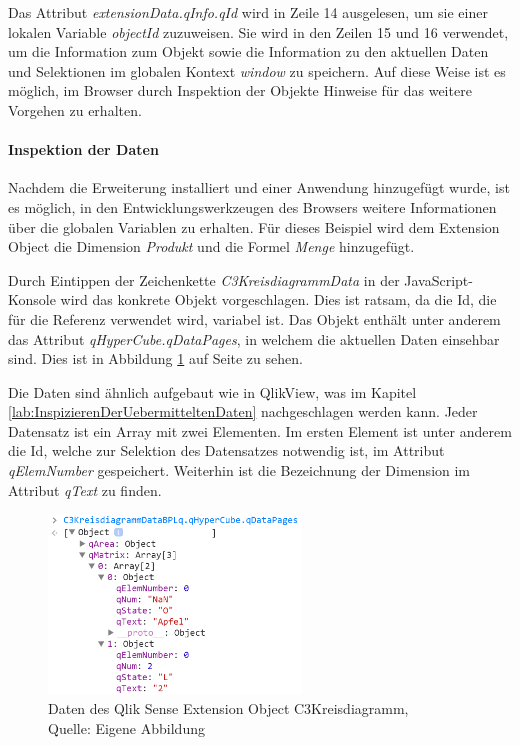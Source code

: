 Das Attribut \textit{extensionData.qInfo.qId} wird in Zeile 14 ausgelesen, um sie einer lokalen Variable \textit{objectId} zuzuweisen. Sie wird in den Zeilen 15 und 16 verwendet, um die Information zum Objekt sowie die Information zu den aktuellen Daten und Selektionen im globalen Kontext \textit{window} zu speichern. Auf diese Weise ist es möglich, im Browser durch Inspektion der Objekte Hinweise für das weitere Vorgehen zu erhalten.

\paragraph{Inspektion der Daten}


Nachdem die Erweiterung installiert und einer Anwendung hinzu\-gefügt wurde, ist es möglich, in den Entwicklungswerkzeugen des Browsers weitere Informationen über die globalen Variablen zu erhalten. Für dieses Beispiel wird dem Extension Object die Dimension \textit{Produkt} und die Formel \textit{Menge} hinzugefügt.

Durch Eintippen der Zeichenkette \textit{C3KreisdiagrammData} in der JavaScript-Konsole wird das konkrete Objekt vorgeschlagen. Dies ist ratsam, da die Id, die für die Referenz verwendet wird, variabel ist. Das Objekt enthält unter anderem das Attribut \textit{qHyperCube.qDataPages}, in welchem die aktuellen Daten einsehbar sind. Dies ist in Abbildung \ref{fig:qDataPages} auf Seite \pageref{fig:qDataPages} zu sehen.

Die Daten sind ähnlich aufgebaut wie in QlikView, was im Kapitel \ref{lab:InspizierenDerUebermitteltenDaten} nachgeschlagen werden kann. Jeder Daten\-satz ist ein Array mit zwei Elementen.
Im ersten Element ist unter anderem die Id, welche zur Selektion des Daten\-satzes notwendig ist, im Attribut \textit{qElemNumber} gespeichert. Weiterhin ist die Bezeichnung der Dimension im Attribut \textit{qText} zu finden. 

\ifIncludeFigures\begin{figure}
	\centering
		\includegraphics[width=0.60\textwidth]{img/QsDevTools/qDataPages.PNG}
	\caption[Daten des Qlik Sense Extension Object C3Kreisdiagramm]{Daten des Qlik Sense Extension Object C3Kreisdiagramm, \\Quelle: Eigene Abbildung}
	\label{fig:qDataPages}
\end{figure}\fi

